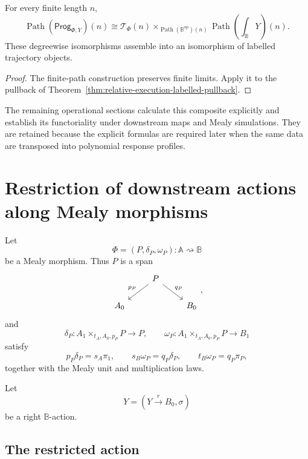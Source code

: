 \begin{corollary}
\label{cor:relative-finite-trajectories-pullback}
For every finite length \(n\),
\[
    \operatorname{Path}(\mathsf{Prog}_{\Phi,Y})(n)
    \cong
    \mathscr T_\Phi(n)
    \times_{\operatorname{Path}(\mathbb B^{\mathrm{op}})(n)}
    \operatorname{Path}\!\left(\int_{\mathbb B}Y\right)(n).
\]
These degreewise isomorphisms assemble into an isomorphism of labelled
trajectory objects.
\end{corollary}

\begin{proof}
The finite-path construction preserves finite limits.  Apply it to the
pullback of Theorem~\ref{thm:relative-execution-labelled-pullback}.
\end{proof}

The remaining operational sections calculate this composite explicitly and
establish its functoriality under downstream maps and Mealy simulations.  They
are retained because the explicit formulas are required later when the same
data are transposed into polynomial response profiles.

\section{Restriction of downstream actions along Mealy morphisms}
\label{sec:relative-evaluation-mealy-morphisms}

Let
\[
\Phi=(P,\delta_P,\omega_P):\mathbb A\rightsquigarrow\mathbb B
\]
be a Mealy morphism. Thus \(P\) is a span
\[
\begin{tikzcd}
& P \arrow[dl,"p_P"'] \arrow[dr,"q_P"] & \\
A_0 && B_0
\end{tikzcd}
,
\]
and
\[
\delta_P:A_1\times_{t_A,A_0,p_P}P\to P,
\qquad
\omega_P:A_1\times_{t_A,A_0,p_P}P\to B_1
\]
satisfy
\[
p_P\delta_P=s_A\pi_1,
\qquad
s_B\omega_P=q_P\delta_P,
\qquad
t_B\omega_P=q_P\pi_P,
\]
together with the Mealy unit and multiplication laws.

Let
\[
Y=(Y\xrightarrow{r}B_0,\sigma)
\]
be a right \(\mathbb B\)-action.

\subsection{The restricted action}
\label{subsec:relative-restricted-action}

